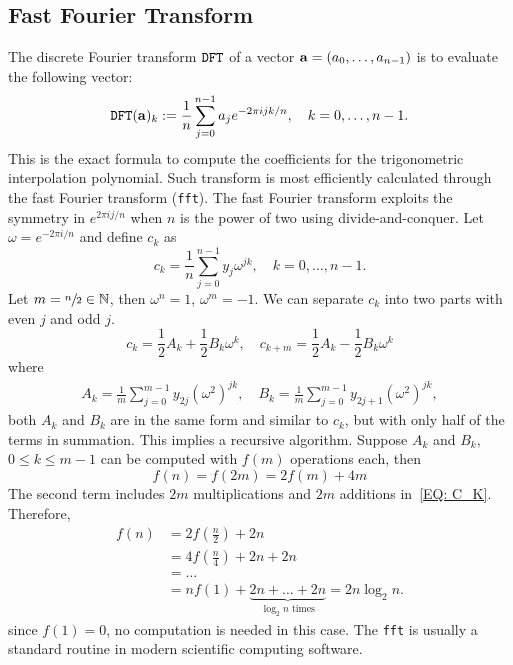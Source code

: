 \subsection{Fast Fourier Transform}
\label{SSec: 2-Fas-Fou-Tra}
The discrete Fourier transform $\textup{\texttt{DFT}}$ of a vector $\mathbf a = (a_0, \dots, a_{n-1})$ is to evaluate the following vector:
$$\textup{\texttt{DFT}}(\mathbf a)_{k} := \frac{1}{n}\sum_{j=0}^{n-1} a_je^{-2\pi i jk/n},\quad k = 0,\dots, n-1.$$
This is the exact formula to compute the coefficients for the trigonometric interpolation polynomial. Such transform is most efficiently calculated through the fast Fourier transform (\texttt{fft}).
The fast Fourier transform exploits the symmetry in $e^{2\pi i j/n}$ when $n$ is the power of two using divide-and-conquer. Let $\omega = e^{-2\pi i/n}$ and define $c_k$ as 
\begin{equation}
    c_k = \frac{1}{n}\sum_{j=0}^{n-1} y_j\omega^{jk},\quad k = 0,\dots, n-1.
\end{equation}
Let $m = \sfrac{n}{2}\in \mathbb N$, then $\omega^n = 1$, $\omega^m = -1$. We can separate $c_k$ into two parts with even $j$ and odd $j$.
\begin{equation}\label{EQ: C_K}
    c_k = \frac{1}{2} A_k + \frac{1}{2} B_k \omega^k,\quad c_{k+m} = \frac{1}{2} A_k - \frac{1}{2} B_k \omega^k 
\end{equation}
where 
\begin{equation}\label{EQ: AK BK}
    \begin{aligned}
        A_k = \frac{1}{m} \sum_{j=0}^{m-1} y_{2j} (\omega^2)^{jk},\quad B_k = \frac{1}{m} \sum_{j=0}^{m-1} y_{2j+1} (\omega^2)^{jk},
    \end{aligned}
\end{equation}
both $A_k$ and $B_k$ are in the same form and similar to $c_k$, but with only half of the terms in summation. This implies a recursive algorithm. Suppose $A_k$ and $B_k$, $0\le k\le m-1$ can be computed with $f(m)$ operations each, then 
\begin{equation}
   f(n) =  f(2m) = 2 f(m) + 4m
\end{equation}
The second term includes $2m$ multiplications and $2m$ additions in~\eqref{EQ: C_K}. Therefore,
\begin{equation}
    \begin{aligned}
        f(n)& = 2f(\frac{n}{2}) + 2n \\
&= 4f(\frac{n}{4}) + 2 n + 2n \\ 
&=\dots \\
&= n f(1) + \underbrace{2n + \dots + 2n}_{\log_2 n \text{ times}} = 2n \log_2 n.
    \end{aligned}
\end{equation}
since $f(1) = 0$, no computation is needed in this case.  The \texttt{fft} is usually a standard routine in modern scientific computing software. 

